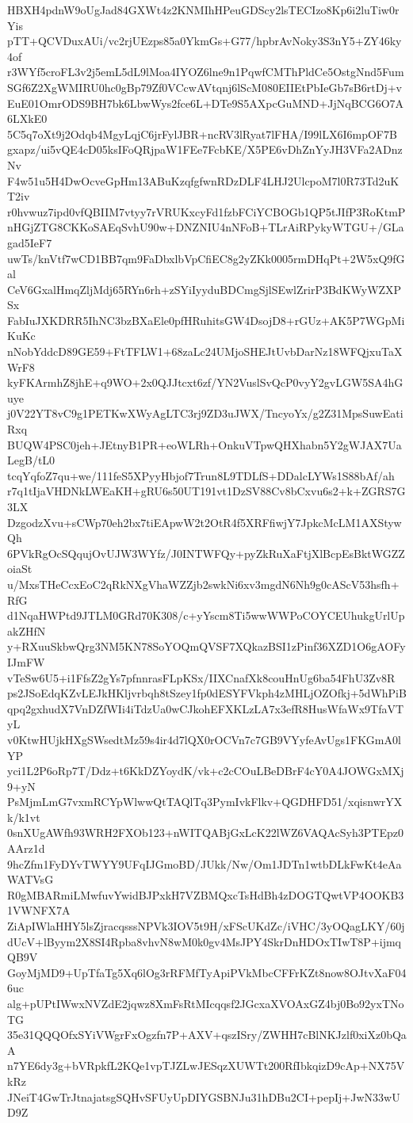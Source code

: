 HBXH4pdnW9oUgJad84GXWt4z2KNMIhHPeuGDScy2lsTECIzo8Kp6i2luTiw0rYis
pTT+QCVDuxAUi/vc2rjUEzps85a0YkmGs+G77/hpbrAvNoky3S3nY5+ZY46ky4of
r3WYf5croFL3v2j5emL5dL9lMoa4IYOZ6lne9n1PqwfCMThPldCe5OstgNnd5Fum
SGf6Z2XgWMIRU0hc0gBp79Zf0VCcwAVtqnj6lScM080EIIEtPbIeGb7sB6rtDj+v
EuE01OmrODS9BH7bk6LbwWys2fce6L+DTe9S5AXpcGuMND+JjNqBCG6O7A6LXkE0
5C5q7oXt9j2Odqb4MgyLqjC6jrFylJBR+ncRV3lRyat7lFHA/I99lLX6I6mpOF7B
gxapz/ui5vQE4cD05ksIFoQRjpaW1FEe7FcbKE/X5PE6vDhZnYyJH3VFa2ADnzNv
F4w51u5H4DwOcveGpHm13ABuKzqfgfwnRDzDLF4LHJ2UlcpoM7l0R73Td2uKT2iv
r0hvwuz7ipd0vfQBIIM7vtyy7rVRUKxcyFd1fzbFCiYCBOGb1QP5tJIfP3RoKtmP
nHGjZTG8CKKoSAEqSvhU90w+DNZNIU4nNFoB+TLrAiRPykyWTGU+/GLagad5IeF7
uwTs/knVtf7wCD1BB7qm9FaDbxlbVpCfiEC8g2yZKk0005rmDHqPt+2W5xQ9fGal
CeV6GxalHmqZljMdj65RYn6rh+zSYiIyyduBDCmgSjlSEwlZrirP3BdKWyWZXPSx
FabIuJXKDRR5IhNC3bzBXaEle0pfHRuhitsGW4DsojD8+rGUz+AK5P7WGpMiKuKc
nNobYddcD89GE59+FtTFLW1+68zaLc24UMjoSHEJtUvbDarNz18WFQjxuTaXWrF8
kyFKArmhZ8jhE+q9WO+2x0QJJtcxt6zf/YN2VuslSvQcP0vyY2gvLGW5SA4hGuye
j0V22YT8vC9g1PETKwXWyAgLTC3rj9ZD3uJWX/TncyoYx/g2Z31MpsSuwEatiRxq
BUQW4PSC0jeh+JEtnyB1PR+eoWLRh+OnkuVTpwQHXhabn5Y2gWJAX7UaLegB/tL0
tcqYqfoZ7qu+we/111feS5XPyyHbjof7Trun8L9TDLfS+DDalcLYWs1S88bAf/ah
r7q1tIjaVHDNkLWEaKH+gRU6s50UT191vt1DzSV88Cv8bCxvu6s2+k+ZGRS7G3LX
DzgodzXvu+sCWp70eh2bx7tiEApwW2t2OtR4f5XRFfiwjY7JpkcMcLM1AXStywQh
6PVkRgOcSQqujOvUJW3WYfz/J0INTWFQy+pyZkRuXaFtjXlBcpEsBktWGZZoiaSt
u/MxsTHeCcxEoC2qRkNXgVhaWZZjb2swkNi6xv3mgdN6Nh9g0cAScV53hsfh+RfG
d1NqaHWPtd9JTLM0GRd70K308/c+yYscm8Ti5wwWWPoCOYCEUhukgUrlUpakZHfN
y+RXuuSkbwQrg3NM5KN78SoYOQmQVSF7XQkazBSI1zPinf36XZD1O6gAOFyIJmFW
vTeSw6U5+i1FfsZ2gYs7pfnnrasFLpKSx/IIXCnafXk8couHnUg6ba54FhU3Zv8R
ps2JSoEdqKZvLEJkHKljvrbqh8tSzey1fp0dESYFVkph4zMHLjOZOfkj+5dWhPiB
qpq2gxhudX7VnDZfWIi4iTdzUa0wCJkohEFXKLzLA7x3efR8HusWfaWx9TfaVTyL
v0KtwHUjkHXgSWsedtMz59s4ir4d7lQX0rOCVn7c7GB9VYyfeAvUgs1FKGmA0lYP
yci1L2P6oRp7T/Ddz+t6KkDZYoydK/vk+c2cCOuLBeDBrF4cY0A4JOWGxMXj9+yN
PsMjmLmG7vxmRCYpWlwwQtTAQlTq3PymIvkFlkv+QGDHFD51/xqisnwrYXk/k1vt
0snXUgAWfh93WRH2FXOb123+nWITQABjGxLcK22lWZ6VAQAcSyh3PTEpz0AArz1d
9hcZfm1FyDYvTWYY9UFqIJGmoBD/JUkk/Nw/Om1JDTn1wtbDLkFwKt4eAaWATVsG
R0gMBARmiLMwfuvYwidBJPxkH7VZBMQxcTsHdBh4zDOGTQwtVP4OOKB31VWNFX7A
ZiApIWlaHHY5lsZjracqsssNPVk3IOV5t9H/xFScUKdZc/iVHC/3yOQagLKY/60j
dUcV+lByym2X8SI4Rpba8vhvN8wM0k0gv4MsJPY4SkrDnHDOxTIwT8P+ijmqQB9V
GoyMjMD9+UpTfaTg5Xq6lOg3rRFMfTyApiPVkMbcCFFrKZt8now8OJtvXaF046uc
alg+pUPtIWwxNVZdE2jqwz8XmFsRtMIcqqsf2JGcxaXVOAxGZ4bj0Bo92yxTNoTG
35e31QQQOfxSYiVWgrFxOgzfn7P+AXV+qszISry/ZWHH7cBlNKJzlf0xiXz0bQaA
n7YE6dy3g+bVRpkfL2KQe1vpTJZLwJESqzXUWTt200RfIbkqizD9cAp+NX75VkRz
JNeiT4GwTrJtnajatsgSQHvSFUyUpDIYGSBNJu31hDBu2CI+pepIj+JwN33wUD9Z
